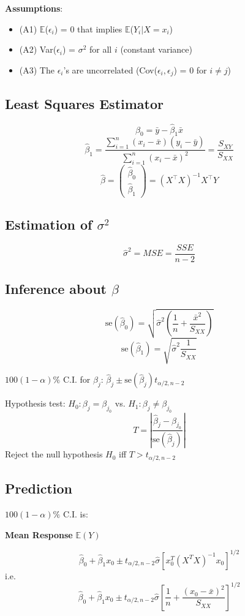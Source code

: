 \documentclass[11pt,a4paper]{article}
\newcommand{\E}{\mathbb{E}}
\begin{document}
\textbf{Assumptions}:
\begin{itemize}
    \item (A1) $\E$($\epsilon_i$) = 0 that implies $\E$($Y_i | X = x_i$)
    \item (A2) Var($\epsilon_i$) = $\sigma^2$ for all $i$ (constant variance)
    \item (A3) The $\epsilon_i$'s are uncorrelated (Cov($\epsilon_i, \epsilon_j$) = 0 for $i \neq j$)
\end{itemize}

\subsection{Least Squares Estimator}
\[
\hat{\beta}_0 = \bar{y} - \hat{\beta}_1 \bar{x}
\]
\[
\hat{\beta}_1 = \frac{\sum_{i=1}^n (x_i - \bar{x})(y_i - \bar{y})}{\sum_{i=1}^n (x_i - \bar{x})^2} = \frac{S_{XY}}{S_{XX}}
\]
\[
\hat{\beta} = 
\begin{pmatrix}
\hat{\beta}_0 \\
\hat{\beta}_1
\end{pmatrix}
= (X^\top X)^{-1} X^\top Y
\]

\subsection{\texorpdfstring{Estimation of $\sigma^2$}{Estimation of sigma squared}}
\[
\hat{\sigma}^2 = MSE = \frac{SSE}{n-2}
\]

\subsection{\texorpdfstring{Inference about $\beta$}{Inference about beta}}
\[
\text{se}(\hat{\beta}_0) = \sqrt{\hat{\sigma}^2 (\frac{1}{n} + \frac{\bar{x}^2}{S_{XX}})}
\]
\[
\text{se}(\hat{\beta}_1) = \sqrt{\hat{\sigma}^2 \frac{1}{S_{XX}}}
\]
\par
$100(1 - \alpha)\%$ C.I. for $\beta_j$: $\hat{\beta}_j \pm \text{se}(\hat{\beta}_j) t_{\alpha/2, n-2}$ \par

Hypothesis test: $H_0: \beta_j = \beta_{j_0}$ vs. $H_1: \beta_j \neq \beta_{j_0}$
\[
T = \left| \frac{\hat{\beta}_j - \beta_{j_0}}{\text{se}(\hat{\beta}_j)}\right|
\]
Reject the null hypothesis $H_0$ iff $T > t_{\alpha/2, n-2}$ \par

\subsection{Prediction}
$100(1 - \alpha)\%$ C.I. is: \par
\textbf{Mean Response} $\E(Y)$ \par
\[
\hat{\beta}_0 + \hat{\beta}_1 x_0 \pm t_{\alpha/2, n-2} \hat{\sigma} \left[x_0^T (X^TX)^{-1} x_0\right]^{1/2}
\]
i.e.
\[
\hat{\beta}_0 + \hat{\beta}_1 x_0 \pm t_{\alpha/2, n-2} \hat{\sigma} \left[\frac{1}{n} + \frac{(x_0 - \bar{x})^2}{S_{XX}}\right]^{1/2}
\]
\end{document}

